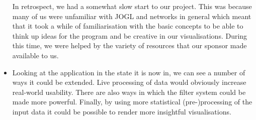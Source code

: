 \documentclass[12pt,a4paper]{article}
\begin{document}
\begin{itemize}
		In retrospect, we had a somewhat slow start to our project. This was because many of us were unfamiliar with JOGL and networks in general which meant that it took a while of familiarisation with the basic concepts to be able to think up ideas for the program and be creative in our visualisations. During this time, we were helped by the variety of resources that our sponsor made available to us.
		\item Looking at the application in the state it is now in, we can see a number of ways it could be extended. Live processing of data would obviously increase real-world usability. There are also ways in which the filter system could be made more powerful. Finally, by using more statistical (pre-)processing of the input data it could be possible to render more insightful visualisations.
	\end{itemize}
	
	
\end{document}
